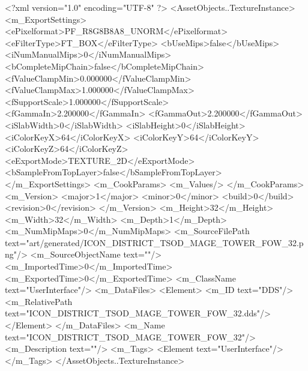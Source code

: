 <?xml version="1.0" encoding="UTF-8" ?>
<AssetObjects..TextureInstance>
	<m_ExportSettings>
		<ePixelformat>PF_R8G8B8A8_UNORM</ePixelformat>
		<eFilterType>FT_BOX</eFilterType>
		<bUseMips>false</bUseMips>
		<iNumManualMips>0</iNumManualMips>
		<bCompleteMipChain>false</bCompleteMipChain>
		<fValueClampMin>0.000000</fValueClampMin>
		<fValueClampMax>1.000000</fValueClampMax>
		<fSupportScale>1.000000</fSupportScale>
		<fGammaIn>2.200000</fGammaIn>
		<fGammaOut>2.200000</fGammaOut>
		<iSlabWidth>0</iSlabWidth>
		<iSlabHeight>0</iSlabHeight>
		<iColorKeyX>64</iColorKeyX>
		<iColorKeyY>64</iColorKeyY>
		<iColorKeyZ>64</iColorKeyZ>
		<eExportMode>TEXTURE_2D</eExportMode>
		<bSampleFromTopLayer>false</bSampleFromTopLayer>
	</m_ExportSettings>
	<m_CookParams>
		<m_Values/>
	</m_CookParams>
	<m_Version>
		<major>1</major>
		<minor>0</minor>
		<build>0</build>
		<revision>0</revision>
	</m_Version>
	<m_Height>32</m_Height>
	<m_Width>32</m_Width>
	<m_Depth>1</m_Depth>
	<m_NumMipMaps>0</m_NumMipMaps>
	<m_SourceFilePath text="art/generated/ICON_DISTRICT_TSOD_MAGE_TOWER_FOW_32.png"/>
	<m_SourceObjectName text=""/>
	<m_ImportedTime>0</m_ImportedTime>
	<m_ExportedTime>0</m_ExportedTime>
	<m_ClassName text="UserInterface"/>
	<m_DataFiles>
		<Element>
			<m_ID text="DDS"/>
			<m_RelativePath text="ICON_DISTRICT_TSOD_MAGE_TOWER_FOW_32.dds"/>
		</Element>
	</m_DataFiles>
	<m_Name text="ICON_DISTRICT_TSOD_MAGE_TOWER_FOW_32"/>
	<m_Description text=""/>
	<m_Tags>
		<Element text="UserInterface"/>
	</m_Tags>
</AssetObjects..TextureInstance>
